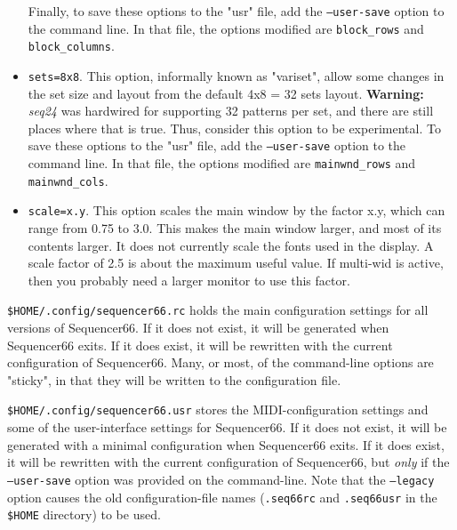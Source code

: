 \begin{itemize}
            Finally, to save these options to the "usr" file, add the
            \texttt{--user-save} option to the command line.
            In that file, the options modified are \texttt{block\_rows} and
            \texttt{block\_columns}.
         \item \texttt{sets=8x8}.
            This option, informally known as "variset", allow some changes in
            the set size and layout from the default 4x8 = 32 sets layout.
            \textbf{Warning:}
            \textsl{seq24} was hardwired for supporting 32 patterns per
            set, and there are still places where that is true.  Thus,
            consider this option to be experimental.
            To save these options to the "usr" file, add the
            \texttt{--user-save} option to the command line.
            In that file, the options modified are \texttt{mainwnd\_rows} and
            \texttt{mainwnd\_cols}.
         \item \texttt{scale=x.y}.
            This option scales the main window by the factor x.y, which can
            range from 0.75 to 3.0.  This makes the main window larger, and
            most of its contents larger.  It does not currently scale the
            fonts used in the display.  A scale factor of 2.5 is about the
            maximum useful value.  If multi-wid is active, then you probably
            need a larger monitor to use this factor.
      \end{itemize}

   \texttt{\$HOME/.config/sequencer66.rc} holds the main configuration settings
   for all versions of Sequencer66.  If it does not exist, it will be generated
   when Sequencer66 exits.  If it does exist, it will be rewritten with the
   current configuration of Sequencer66.  Many, or most, of the command-line
   options are "sticky", in that they will be written to the configuration
   file.

   \texttt{\$HOME/.config/sequencer66.usr} stores the MIDI-configuration
   settings and some of the user-interface settings for Sequencer66.  If it
   does not exist, it will be generated with a minimal configuration when
   Sequencer66 exits.  If it does exist, it will be rewritten with the current
   configuration of Sequencer66, but \textsl{only} if the
   \texttt{--user-save} option was provided on the command-line.
   Note that the
   \texttt{--legacy} option causes the old
   configuration-file names (\texttt{.seq66rc} and \texttt{.seq66usr}
   in the \texttt{\$HOME} directory)
   to be used.

